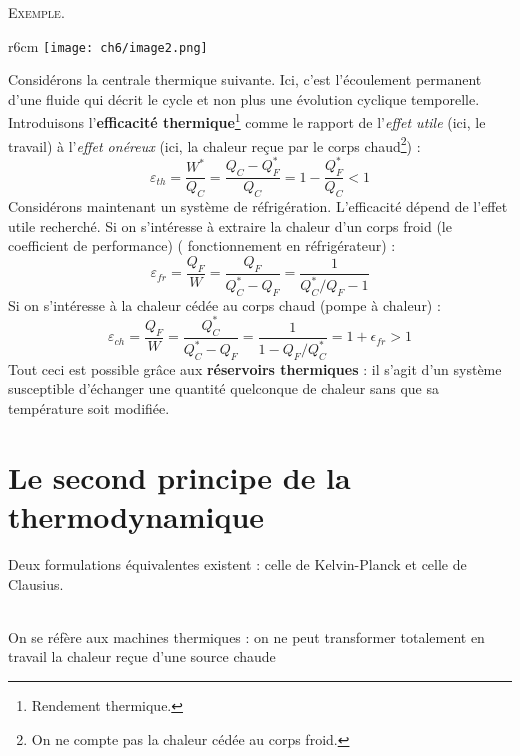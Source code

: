 	\textsc{Exemple}. \\
	\begin{wrapfigure}[9]{r}{6cm}
	\vspace{-9mm}
	\texttt{[image: ch6/image2.png]}
	\end{wrapfigure}
	Considérons la centrale thermique suivante. Ici, 
	c'est l'écoulement permanent d'une fluide qui décrit le cycle et 
	non plus une évolution cyclique temporelle.\\
	Introduisons l'\textbf{efficacité thermique}\footnote{Rendement 
	thermique.} comme le rapport de l'\textit{effet utile} (ici, le 
	travail) à l'\textit{effet onéreux} (ici, la chaleur reçue par 
	le corps chaud\footnote{On ne compte pas la chaleur cédée au corps 
	froid.}) :
	\begin{equation}
	\varepsilon_{th} = \frac{W^*}{Q_C} = \frac{Q_C-Q_F^*}{Q_C} = 1-
	\frac{Q_F^*}{Q_C} <1
	\end{equation}
	Considérons maintenant un système de réfrigération. L'efficacité 
	dépend de l'effet utile recherché. Si on s'intéresse à extraire 
	la chaleur d'un corps froid (le coefficient de performance) (%
	fonctionnement en réfrigérateur) :
	\begin{equation}
	\varepsilon_{fr} = \frac{Q_F}{W} = \frac{Q_F}{Q_C^*-Q_F} = \frac{
	1}{Q_C^*/Q_F-1}
	\end{equation}
	Si on s'intéresse  à la chaleur cédée au corps chaud (pompe à 
	chaleur) : 
	\begin{equation}
	\varepsilon_{ch} = \frac{Q_F}{W}=\frac{Q_C^*}{Q_C^*-Q_F}=\frac{1}{
	1-Q_F/Q_C^*} = 1+\epsilon_{fr} >1
	\end{equation}
	Tout ceci est possible grâce aux \textbf{réservoirs thermiques} : 
	il s'agit d'un système susceptible d'échanger une quantité 
	quelconque de chaleur sans que sa température soit modifiée.
	
	
	\section{Le second principe de la thermodynamique}
	Deux formulations équivalentes existent : celle de Kelvin-Planck 
	et celle de Clausius. 
	
	\ \\
	On se réfère aux machines thermiques : on ne peut transformer 
	totalement en travail la chaleur reçue d'une source chaude\\
	
